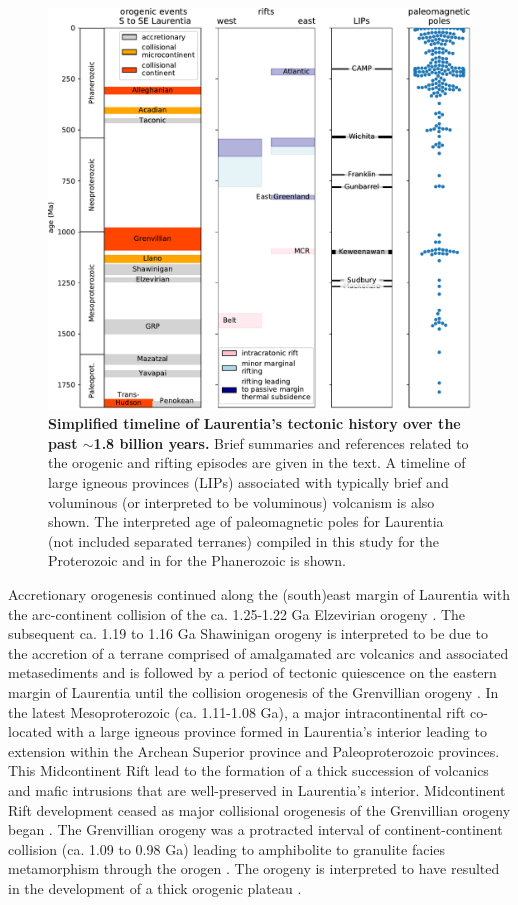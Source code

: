 \documentclass[11pt,letterpaper]{article}
\begin{document}
\begin{figure}
\centering
\includegraphics[width=\textwidth]{../Figures/Tectonic_history.pdf}
\caption{\small{\textbf{Simplified timeline of Laurentia's tectonic history over the past $\sim$1.8 billion years.} Brief summaries and references related to the orogenic and rifting episodes are given in the text. A timeline of large igneous provinces  (LIPs) associated with typically brief and voluminous (or interpreted to be voluminous) volcanism is also shown. The interpreted age of paleomagnetic poles for Laurentia (not included separated terranes) compiled in this study for the Proterozoic and in \cite{Torsvik2012a} for the Phanerozoic is shown.}}
\label{fig:tectonic_history}
\end{figure}

Accretionary orogenesis continued along the (south)east margin of Laurentia with the arc-continent collision of the ca. 1.25-1.22 Ga Elzevirian orogeny \citep{McLelland2013a}. The subsequent ca. 1.19 to 1.16 Ga Shawinigan orogeny is interpreted to be due to the accretion of a terrane comprised of amalgamated arc volcanics and associated metasediments and is followed by a period of tectonic quiescence on the eastern margin of Laurentia until the collision orogenesis of the Grenvillian orogeny \citep{McLelland2010a}. In the latest Mesoproterozoic (ca. 1.11-1.08 Ga), a major intracontinental rift co-located with a large igneous province formed in Laurentia's interior leading to extension within the Archean Superior province and Paleoproterozoic provinces. This Midcontinent Rift lead to the formation of a thick succession of volcanics and mafic intrusions that are well-preserved in Laurentia's interior.  Midcontinent Rift development ceased as major collisional orogenesis of the Grenvillian orogeny began \citep{Swanson-Hysell2019a}. The Grenvillian orogeny was a protracted interval of continent-continent collision (ca. 1.09 to 0.98 Ga) leading to amphibolite to granulite facies metamorphism through the orogen \citep{McLelland2010a}. The orogeny is interpreted to have resulted in the development of a thick orogenic plateau \citep{Rivers2008a}.
\end{document}
